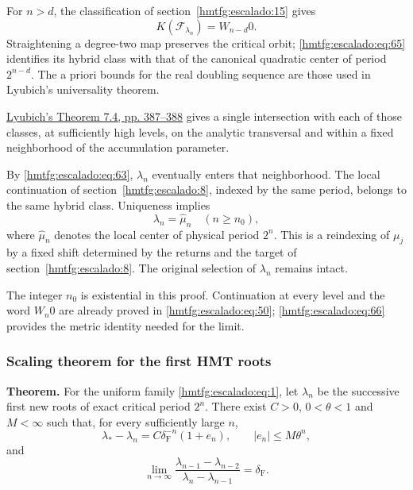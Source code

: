 For \(n>d\), the classification of section~\ref{hmtfg:escalado:15} gives
\begin{equation}
K(\mathcal F_{\lambda_n})=W_{n-d}0.
\label{hmtfg:escalado:eq:65}
\end{equation}
Straightening a degree-two map preserves the critical orbit; \eqref{hmtfg:escalado:eq:65} identifies its hybrid class with that of the canonical quadratic center of period \(2^{n-d}\). The a priori bounds for the real doubling sequence are those used in Lyubich’s universality theorem.

\href{https://www.maths.tcd.ie/EMIS/journals/Annals/149_2/lyubich.pdf\#page=69}{Lyubich’s Theorem 7.4, pp. 387–388} gives a single intersection with each of those classes, at sufficiently high levels, on the analytic transversal and within a fixed neighborhood of the accumulation parameter.

By \eqref{hmtfg:escalado:eq:63}, \(\lambda_n\) eventually enters that neighborhood. The local continuation of section~\ref{hmtfg:escalado:8}, indexed by the same period, belongs to the same hybrid class. Uniqueness implies
\begin{equation}
\boxed{\lambda_n=\widehat\mu_n\quad(n\ge n_0),}
\label{hmtfg:escalado:eq:66}
\end{equation}
where \(\widehat\mu_n\) denotes the local center of physical period \(2^n\). This is a reindexing of \(\mu_j\) by a fixed shift determined by the returns and the target of section~\ref{hmtfg:escalado:8}. The original selection of \(\lambda_n\) remains intact.

The integer \(n_0\) is existential in this proof. Continuation at every level and the word \(W_n0\) are already proved in \eqref{hmtfg:escalado:eq:50}; \eqref{hmtfg:escalado:eq:66} provides the metric identity needed for the limit.

\subsubsection{Scaling theorem for the first HMT roots}
\label{hmtfg:escalado:17.3}

\textbf{Theorem.} For the uniform family \eqref{hmtfg:escalado:eq:1}, let \(\lambda_n\) be the successive first new roots of exact critical period \(2^n\). There exist \(C>0\), \(0<\theta<1\) and \(M<\infty\) such that, for every sufficiently large \(n\),
\begin{equation}
\lambda_*-\lambda_n=C\delta_{\mathrm F}^{-n}(1+e_n),
\qquad |e_n|\le M\theta^n,
\label{hmtfg:escalado:eq:67}
\end{equation}
and
\begin{equation}
\boxed{\lim_{n\to\infty}
\frac{\lambda_{n-1}-\lambda_{n-2}}
{\lambda_n-\lambda_{n-1}}=\delta_{\mathrm F}.}
\label{hmtfg:escalado:eq:68}
\end{equation}

